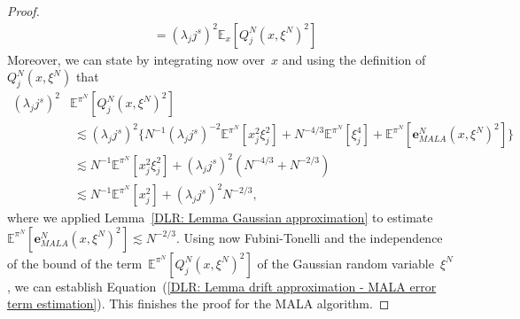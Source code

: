 \begin{proof}
\begin{align*}
  & =  (\lambda_j j^s)^2  \mathbb{E}_x[Q^N_j (x, \xi^N)^2]
 \end{align*}
 Moreover, we can state by integrating now over~$x$ and using the definition of~$Q^N_j (x, \xi^N)$ that
 \begin{align*}
   (\lambda_j j^s)^2 & \mathbb{E}^{\pi^N}[Q^N_j (x, \xi^N)^2] \\
   & \; \lesssim  (\lambda_j j^s)^2 \{ N^{-1} (\lambda_j j^s)^{-2} \mathbb{E}^{\pi^N}[x_j^2\xi_j^2] + N^{-4/3} \mathbb{E}^{\pi^N}[\xi^4_j] + \mathbb{E}^{\pi^N}[  \textbf{e}^N_{MALA}(x, \xi^N)^2] \} \\
   & \; \lesssim N^{-1} \mathbb{E}^{\pi^N}[ x_j^2 \xi_j^2] +  (\lambda_j j^s)^2 (N^{-4/3} + N^{-2/3}) \\
   & \; \lesssim N^{-1} \mathbb{E}^{\pi^N}[x_j^2] +  (\lambda_j j^s)^2 N^{-2/3},
 \end{align*}
 where we applied Lemma~\ref{DLR: Lemma Gaussian approximation} to estimate $\mathbb{E}^{\pi^N}[  \textbf{e}^N_{MALA}(x, \xi^N)^2] \lesssim N^{-2/3}$. Using now Fubini-Tonelli and the independence of the bound of the term~$\mathbb{E}^{\pi^N}[Q^N_j (x, \xi^N)^2]$ of the Gaussian random variable~$\xi^N$, we can establish Equation~(\ref{DLR: Lemma drift approximation - MALA error term estimation}). This finishes the proof for the MALA algorithm.
 \newline
 

\end{proof}
